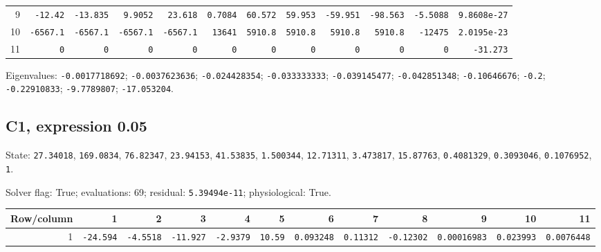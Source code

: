 \begin{landscape}
\begin{tabular}{rrrrrrrrrrrr}
9 & \texttt{-12.42} & \texttt{-13.835} & \texttt{9.9052} & \texttt{23.618} & \texttt{0.7084} & \texttt{60.572} & \texttt{59.953} & \texttt{-59.951} & \texttt{-98.563} & \texttt{-5.5088} & \texttt{9.8608e-27} \\

10 & \texttt{-6567.1} & \texttt{-6567.1} & \texttt{-6567.1} & \texttt{-6567.1} & \texttt{13641} & \texttt{5910.8} & \texttt{5910.8} & \texttt{5910.8} & \texttt{5910.8} & \texttt{-12475} & \texttt{2.0195e-23} \\

11 & \texttt{0} & \texttt{0} & \texttt{0} & \texttt{0} & \texttt{0} & \texttt{0} & \texttt{0} & \texttt{0} & \texttt{0} & \texttt{0} & \texttt{-31.273} \\

\bottomrule\end{tabular}\par\endgroup

{\scriptsize Eigenvalues: \texttt{-0.0017718692}; \texttt{-0.0037623636}; \texttt{-0.024428354}; \texttt{-0.033333333}; \texttt{-0.039145477}; \texttt{-0.042851348}; \texttt{-0.10646676}; \texttt{-0.2}; \texttt{-0.22910833}; \texttt{-9.7789807}; \texttt{-17.053204}.\par}

\subsection*{C1, expression 0.05}
{\scriptsize State: \texttt{27.34018}, \texttt{169.0834}, \texttt{76.82347}, \texttt{23.94153}, \texttt{41.53835}, \texttt{1.500344}, \texttt{12.71311}, \texttt{3.473817}, \texttt{15.87763}, \texttt{0.4081329}, \texttt{0.3093046}, \texttt{0.1076952}, \texttt{1}.\par

Solver flag: True; evaluations: 69; residual: \texttt{5.39494e-11}; physiological: True.\par}

\begingroup\scriptsize\setlength{\tabcolsep}{3pt}\centering
\begin{tabular}{rrrrrrrrrrrr}\toprule

Row/column & 1 & 2 & 3 & 4 & 5 & 6 & 7 & 8 & 9 & 10 & 11 \\ \midrule

1 & \texttt{-24.594} & \texttt{-4.5518} & \texttt{-11.927} & \texttt{-2.9379} & \texttt{10.59} & \texttt{0.093248} & \texttt{0.11312} & \texttt{-0.12302} & \texttt{0.00016983} & \texttt{0.023993} & \texttt{0.0076448} \\


\end{tabular}
\end{landscape}
